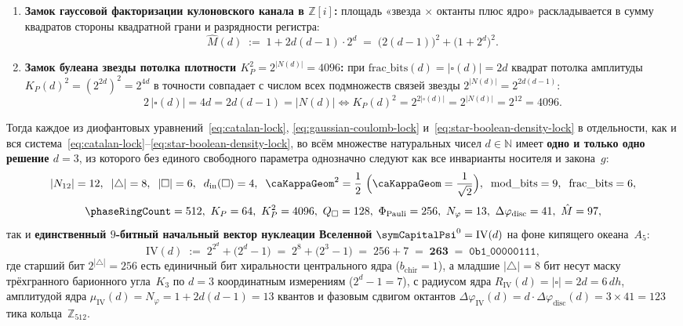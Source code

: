 \begin{theorem}[Диофантова единственность $d=3$ ($1+2^d=d^2$), единственность начального вектора $\mathrm{IV}(3)=263$ и полная замкнутость траектории $\symCapitalPsi^t = g^t(\mathrm{IV}(3))$]
\begin{enumerate}[label=(\roman*)]
\begin{equation}
  \end{equation}
  делится нацело без остатка.
\item \textbf{Замок гауссовой факторизации кулоновского канала в $\mathbb{Z}[i]$:} площадь «звезда $\times$ октанты плюс ядро»
  раскладывается в сумму квадратов стороны квадратной грани и разрядности регистра:
  \begin{equation}
  \label{eq:gaussian-coulomb-lock}
    \hat M(d) \;:=\; 1 + 2d(d-1)\cdot 2^d \;=\; \bigl(2(d-1)\bigr)^2 + \bigl(1 + 2^d\bigr)^2.
  \end{equation}
\item \textbf{Замок булеана звезды потолка плотности $K_P^2 = 2^{|N(d)|} = 4096$:} при $\mathrm{frac\_bits}(d) = |\square(d)| = 2d$
  квадрат потолка амплитуды $K_P(d)^2 = (2^{2d})^2 = 2^{4d}$ в точности совпадает с числом всех подмножеств связей звезды $2^{|N(d)|} = 2^{2d(d-1)}$:
  \begin{equation}
  \label{eq:star-boolean-density-lock}
    2\,|\square(d)| = 4d = 2d(d-1) = |N(d)|
    \iff
    K_P(d)^2 = 2^{2|\square(d)|} = 2^{|N(d)|} = 2^{12} = 4096.
  \end{equation}
\end{enumerate}
Тогда каждое из диофантовых уравнений~\eqref{eq:catalan-lock}, \eqref{eq:gaussian-coulomb-lock} и~\eqref{eq:star-boolean-density-lock} в отдельности, как и вся система~\eqref{eq:catalan-lock}--\eqref{eq:star-boolean-density-lock}, во всём множестве натуральных чисел $d\in\mathbb{N}$
имеет \textbf{одно и только одно решение $d = 3$}, из которого без единого свободного параметра однозначно следуют как все инварианты носителя и закона~$g$:
\[
  |N_{12}|=12,\;\; |\triangle|=8,\;\; |\square|=6,\;\; d_{\mathrm{in}}(\square)=4,\;\; \caKappaGeom^2=\frac{1}{2}\ \Bigl(\caKappaGeom=\frac{1}{\sqrt{2}}\Bigr),\;\;
  \mathrm{mod\_bits}=9,\;\; \mathrm{frac\_bits}=6,
\]
\[
  \phaseRingCount=512,\ K_P=64,\ K_P^2=4096,\ Q_\square=128,\ \Phi_{\mathrm{Pauli}}=256,\ N_\varphi=13,\ \Delta\varphi_{\mathrm{disc}}=41,\ \hat M = 97,
\]
так и \textbf{единственный $9$-битный начальный вектор нуклеации Вселенной} $\symCapitalPsi^{0} = \mathrm{IV}(d)$ на фоне кипящего океана~$A_5$:
\begin{equation}
\label{eq:unique-initial-vector-d3}
  \mathrm{IV}(d) \;:=\; 2^{2^d} + \bigl(2^d - 1\bigr) \;=\; 2^{8} + \bigl(2^{3} - 1\bigr) \;=\; 256 + 7 \;=\; \mathbf{263} \;=\; \texttt{0b1\_00000111},
\end{equation}
где старший бит $2^{|\triangle|}=256$ есть единичный бит хиральности центрального ядра ($b_{\mathrm{chir}}=1$),
а младшие $|\triangle|=8$ бит несут маску трёхгранного барионного угла~$K_3$ по $d=3$ координатным измерениям ($2^d-1=7$),
с радиусом ядра $R_{\mathrm{IV}}(d) = |\square| = 2d = 6\,dh$, амплитудой ядра $\mu_{\mathrm{IV}}(d) = N_\varphi = 1 + 2d(d-1) = 13$ квантов
и фазовым сдвигом октантов $\Delta\varphi_{\mathrm{IV}}(d) = d\cdot\Delta\varphi_{\mathrm{disc}}(d) = 3\times 41 = 123$ тика кольца~$\mathbb{Z}_{512}$.


\end{theorem}
